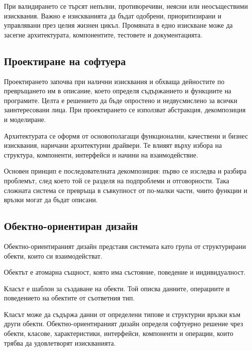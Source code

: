 При валидирането се търсят непълни, противоречиви, неясни или неосъществими изисквания. Важно е изискванията да бъдат одобрени, приоритизирани и управлявани през целия жизнен цикъл. Промяната в едно изискване може да засегне архитектурата, компонентите, тестовете и документацията.

\subsection{Проектиране на софтуера}\label{s:26.6.1}

Проектирането започва при налични изисквания и обхваща дейностите по превръщането им в описание, което определя съдържанието и функциите на програмите. Целта е решението да бъде опростено и недвусмислено за всички заинтересовани лица. При проектирането се използват абстракция, декомпозиция и моделиране.

Архитектурата се оформя от основополагащи функционални, качествени и бизнес изисквания, наричани архитектурни драйвери. Те влияят върху избора на структура, компоненти, интерфейси и начини на взаимодействие.

Основен принцип е последователната декомпозиция: първо се изследва и разбира проблемът, след което той се разделя на подпроблеми и отговорности. Така сложната система се превръща в съвкупност от по-малки части, чиито функции и връзки могат да бъдат описани.

\subsection{Обектно-ориентиран дизайн}\label{s:26.6.2}

\begin{defn}
Обектно-ориентираният дизайн представя системата като група от структурирани обекти, които си взаимодействат.
\end{defn}

\begin{defn}[Обект]
Обектът е атомарна същност, която има състояние, поведение и индивидуалност.
\end{defn}

\begin{defn}[Клас]
Класът е шаблон за създаване на обекти. Той описва данните, операциите и поведението на обектите от съответния тип.
\end{defn}

Класът може да съдържа данни от определени типове и структурни връзки към други обекти. Обектно-ориентираният дизайн определя софтуерно решение чрез обекти, класове, характеристики, интерфейси, компоненти и операции, които трябва да удовлетворят изискванията.

